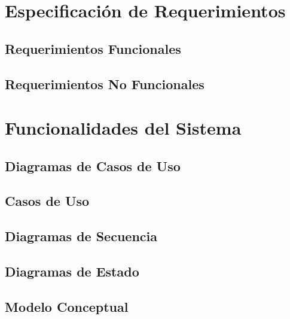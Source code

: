 \section{Especificación de Requerimientos}
\label{sc:ER}


\subsection{Requerimientos Funcionales}
\label{ssc:RF}


\subsection{Requerimientos No Funcionales}
\label{ssc:RNF}
\section{Funcionalidades del Sistema}
\label{sc:FS}


\subsection{Diagramas de Casos de Uso}
\label{ssc:DCU}


\subsection{Casos de Uso}
\label{ssc:CU}

\subsection{Diagramas de Secuencia}
\label{ssc:DSS}

\subsection{Diagramas de Estado}
\label{ssc:DE}


\subsection{Modelo Conceptual}
\label{ssc:MC}
